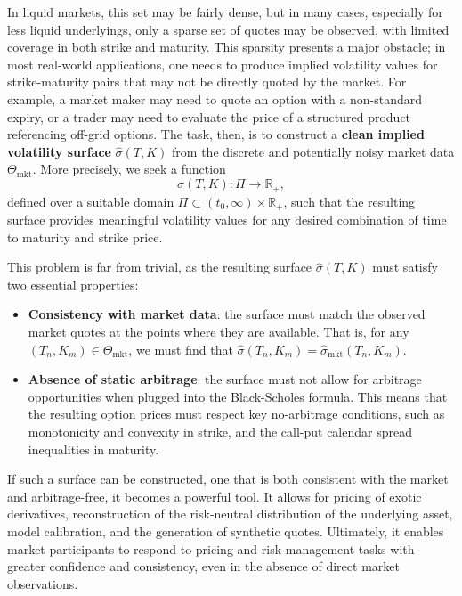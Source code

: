 In liquid markets, this set may be fairly dense, but in many cases, especially for less liquid underlyings, only a sparse set of quotes may be observed, with limited coverage in both strike and maturity.
This sparsity presents a major obstacle; in most real-world applications, one needs to produce implied volatility values for strike-maturity pairs that may not be directly quoted by the market.
For example, a market maker may need to quote an option with a non-standard expiry, or a trader may need to evaluate the price of a structured product referencing off-grid options.
The task, then, is to construct a \textbf{clean implied volatility surface} $\hat{\sigma}(T, K)$ from the discrete and potentially noisy market data $\Theta_{\text{mkt}}$.
More precisely, we seek a function
\[
    \hat{\sigma}(T, K): \Pi \to \mathbb{R}_+,
\]
defined over a suitable domain $\Pi \subset (t_0, \infty) \times \mathbb{R}_+$, such that the resulting surface provides meaningful volatility values for any desired combination of time to maturity and strike price.

This problem is far from trivial, as the resulting surface $\hat{\sigma}(T, K)$ must satisfy two essential properties:

\begin{itemize}
    \item \textbf{Consistency with market data}: the surface must match the observed market quotes at the points where they are available.
        That is, for any $(T_n, K_m) \in \Theta_{\text{mkt}}$, we must find that $\hat{\sigma}(T_n, K_m) = \hat{\sigma}_{\text{mkt}}(T_n, K_m)$.
    \item \textbf{Absence of static arbitrage}: the surface must not allow for arbitrage opportunities when plugged into the Black-Scholes formula.
        This means that the resulting option prices must respect key no-arbitrage conditions, such as monotonicity and convexity in strike, and the call-put calendar spread inequalities in maturity.
\end{itemize}

If such a surface can be constructed, one that is both consistent with the market and arbitrage-free, it becomes a powerful tool.
It allows for pricing of exotic derivatives, reconstruction of the risk-neutral distribution of the underlying asset, model calibration, and the generation of synthetic quotes.
Ultimately, it enables market participants to respond to pricing and risk management tasks with greater confidence and consistency, even in the absence of direct market observations.

